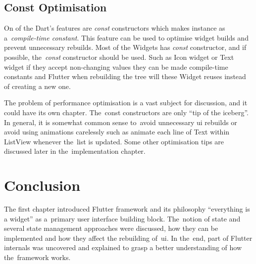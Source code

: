 \subsection{Const Optimisation}
On of the Dart's features are \textit{const} constructors which makes instance as a~\textit{compile-time constant}. This feature can be used to optimise widget builds and prevent unnecessary rebuilds. Most of the Widgets has \textit{const} constructor, and if possible, the~\textit{const} constructor should be used. Such as Icon widget or Text widget if they accept non-changing values they can be made compile-time constants and Flutter when rebuilding the tree will these Widget reuses instead of creating a new one. 

The problem of performance optimisation is a vast subject for discussion, and it could have its own chapter. The~const constructors are only ``tip of the iceberg''. In general, it is somewhat common sense to~avoid unnecessary \gls{ui} rebuilds or avoid using animations carelessly such as animate each line of Text within ListView whenever the~list is updated. Some other optimisation tips are discussed later in the~implementation chapter. 

\section{Conclusion}
The first chapter introduced Flutter framework and its philosophy ``everything is a widget'' as a~primary user interface building block. The~notion of state and several state management approaches were discussed, how they can be implemented and how they affect the rebuilding of~\gls{ui}. In the~end, part of Flutter internals was uncovered and explained to grasp a better understanding of how the~framework works.